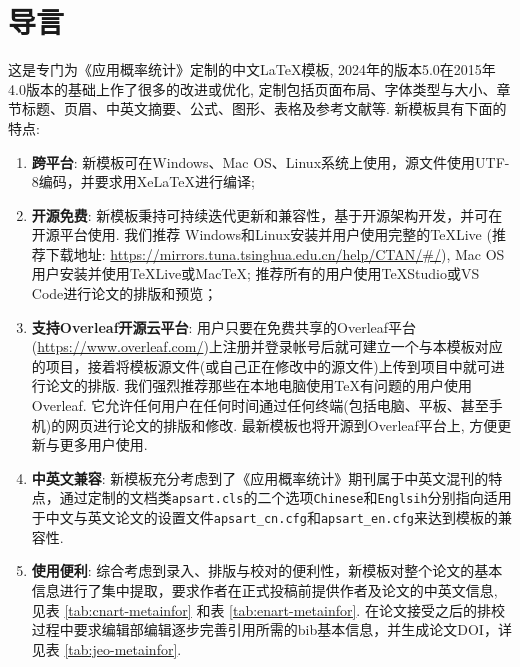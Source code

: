 \documentclass[Chinese]{APSart}
\begin{document}
\section{导言}
这是专门为《应用概率统计》定制的中文\LaTeX{}模板, 2024年的版本5.0在2015年4.0版本的基础上作了很多的改进或优化, 定制包括页面布局、字体类型与大小、章节标题、页眉、中英文摘要、公式、图形、表格及参考文献等. 新模板具有下面的特点: 
\begin{enumerate}[leftmargin=7.8mm,itemsep=-0.1ex,label=(\arabic*)]
\item \textbf{跨平台}: 新模板可在Windows、Mac OS、Linux系统上使用，源文件使用UTF-8编码，并要求用Xe\LaTeX{}进行编译;
\item \textbf{开源免费}: 新模板秉持可持续迭代更新和兼容性，基于开源架构开发，并可在开源平台使用. 我们推荐 Windows和Linux安装并用户使用完整的TeXLive (推荐下载地址: 
\url{https://mirrors.tuna.tsinghua.edu.cn/help/CTAN/#/}), Mac OS用户安装并使用TeXLive或Mac\TeX{}; 推荐所有的用户使用TeXStudio或VS Code进行论文的排版和预览；
\item \textbf{支持Overleaf开源云平台}: 用户只要在免费共享的Overleaf平台(\url{https://www.overleaf.com/})上注册并登录帐号后就可建立一个与本模板对应的项目，接着将模板源文件(或自己正在修改中的源文件)上传到项目中就可进行论文的排版. 我们强烈推荐那些在本地电脑使用\TeX{}有问题的用户使用Overleaf. 它允许任何用户在任何时间通过任何终端(包括电脑、平板、甚至手机)的网页进行论文的排版和修改. 最新模板也将开源到Overleaf平台上, 方便更新与更多用户使用. 
\item \textbf{中英文兼容}: 新模板充分考虑到了《应用概率统计》期刊属于中英文混刊的特点，通过定制的文档类\texttt{apsart.cls}的二个选项\texttt{Chinese}和\texttt{Englsih}分别指向适用于中文与英文论文的设置文件\verb/apsart_cn.cfg/和\verb/apsart_en.cfg/来达到模板的兼容性.
\item \textbf{使用便利}: 综合考虑到录入、排版与校对的便利性，新模板对整个论文的基本信息进行了集中提取，要求作者在正式投稿前提供作者及论文的中英文信息, 见表 \ref{tab:cnart-metainfor} 和表 \ref{tab:enart-metainfor}. 在论文接受之后的排校过程中要求编辑部编辑逐步完善引用所需的bib基本信息，并生成论文DOI，详见表 \ref{tab:jeo-metainfor}. 


\end{enumerate}
\end{document}
